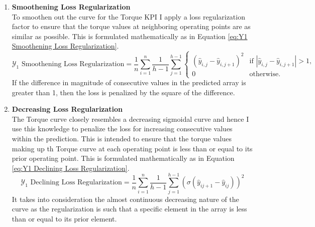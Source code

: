 \documentclass{report} %
\begin{document}
\begin{enumerate}
\item \textbf{Smoothening Loss Regularization} \\
To smoothen out the curve for the Torque \ac{KPI} I apply a loss regularization factor to ensure that the torque values at neighboring operating points are 
as similar as possible. This is formulated mathematically as in Equation \ref{eq:Y1 Smoothening Loss Regularization}.
\begin{equation}
    \text{$\mathcal{Y}_1$ Smoothening Loss Regularization} = \frac{1}{n} \sum_{i=1}^{n} \frac{1}{h-1} \sum_{j=1}^{h-1}
    \begin{cases} 
        \left( \hat{y}_{i,j} - \hat{y}_{i,j+1}  \right)^2 & \text{if } |\hat{y}_{i,j} - \hat{y}_{i,j+1}| > 1, \\
        0 & \text{otherwise}.
    \end{cases}
    \label{eq:Y1 Smoothening Loss Regularization}
\end{equation}
If the difference in magnitude of consecutive values in the predicted array is greater than 1, then the loss is penalized by the square of the difference.
\item \textbf{Decreasing Loss Regularization} \\
The Torque curve closely resembles a decreasing sigmoidal curve and hence I use this knowledge to penalize the loss for increasing consecutive values within the prediction. 
This is intended to ensure that the torque values making up th Torque curve at each operating point is less than or equal to its prior operating point.
This is formulated mathematically as in Equation \ref{eq:Y1 Declining Loss Regularization}.
\begin{equation}
    \text{$\mathcal{Y}_1$ Declining Loss Regularization} = \frac{1}{n} \sum_{i=1}^{n}\frac{1}{h-1} \sum_{j=1}^{h-1} \left(\sigma(\hat{y}_{i{j+1}} - \hat{y}_{ij})\right)^2
    \label{eq:Y1 Declining Loss Regularization}
\end{equation} 
It takes into consideration the almost continuous decreasing nature of the curve as the regularization is such that a specific element in the array is less than or 
equal to its prior element.
\end{enumerate}
\end{document}

